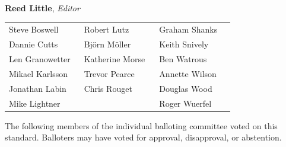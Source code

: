 \begin{center}{\bfseries Reed Little}, \textit{Editor}
\end{center}
\vspace{-4pt}
{\fontsize{8.15}{9.15}\selectfont
\renewcommand{\arraystretch}{0.98}
    \begin{tabular}{@{}Y{0.31\linewidth}Y{0.31\linewidth}Y{0.31\linewidth}@{}}
        Steve Boswell   & Robert Lutz     & Graham Shanks  \\
        Dannie Cutts    & Björn Möller    & Keith Snively  \\
        Len Granowetter & Katherine Morse & Ben Watrous    \\
        Mikael Karlsson & Trevor Pearce   & Annette Wilson \\
        Jonathan Labin  & Chris Rouget    & Douglas Wood   \\
        Mike Lightner   &                 & Roger Wuerfel  \\
    \end{tabular}}

\vspace{9pt}
The following members of the individual balloting committee voted on this standard. Balloters may have voted for approval, disapproval, or abstention.
\vspace{2pt}

